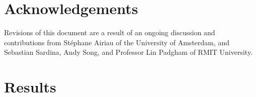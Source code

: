 \documentclass[a4paper]{article}
\newcommand{\cc}{\emph{Concurrent}\xspace}
\newcommand{\st}{\emph{Stable}\xspace}
\newcommand{\tiv}{\emph{testImpactvars}\xspace}
\newcommand{\stephane}{{St\'ephane}\xspace}
\begin{document}
\section{Acknowledgements}

Revisions of this document are a result of an ongoing discussion and contributions from \stephane Airiau of the University of Amsterdam, and Sebastian Sardina, Andy Song, and Professor Lin Padgham of RMIT University.


 


\appendix

\section{Results}
\label{sec:results}










\end{document}
